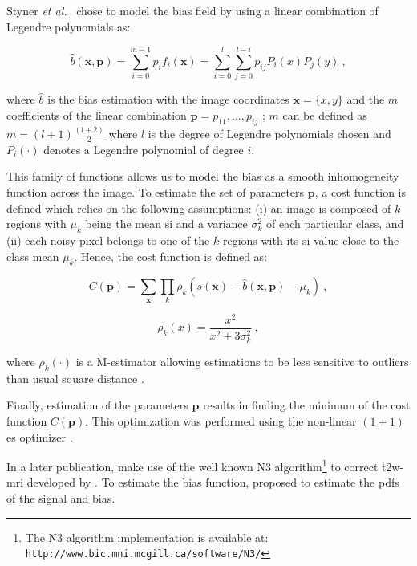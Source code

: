 \begin{enumerate}[leftmargin=*]
{\color{blue}
Styner \textit{et al.}~\cite{Styner2000} chose to model the bias field by using a linear combination of Legendre polynomials as:

\begin{equation}
	\hat{b}(\mathbf{x},\mathbf{p}) = \sum_{i=0}^{m-1} p_i f_i(\mathbf{x}) =  \sum_{i=0}^{l} \sum_{j=0}^{l-i} p_{ij} P_i(x) P_j(y) \ ,
	\label{eq:biascorr}
\end{equation}

\noindent where $\hat{b}$ is the bias estimation with the image coordinates $\mathbf{x} = \{x,y\}$ and the $m$ coefficients of the linear combination $\mathbf{p} = {p_{11},\dotsc,p_{ij}}$ ; $m$ can be defined as $m=(l+1)\frac{(l+2)}{2}$ where $l$ is the degree of Legendre polynomials chosen and $P_i(\cdot)$ denotes a Legendre polynomial of degree $i$.

This family of functions allows us to model the bias as a smooth inhomogeneity function across the image.
To estimate the set of parameters $\mathbf{p}$, a cost function is defined which relies on the following assumptions: (i) an image is composed of $k$ regions with $\mu_k$ being the mean \ac{si} and a variance $\sigma^{2}_{k}$ of each particular class, and (ii) each noisy pixel belongs to one of the $k$ regions with its \ac{si} value close to the class mean $\mu_k$.
Hence, the cost function is defined as:

\begin{equation}
	C(\mathbf{p}) = \sum_{\mathbf{x}} \prod_{k} \rho_k(s(\mathbf{x}) - \hat{b}(\mathbf{x},\mathbf{p}) - \mu_k) \ ,
	\label{eq:costbias}
\end{equation}

\begin{equation}
	\rho_k(x) = \frac{x^2}{x^2 + 3 \sigma_k^2} \ ,
	\label{eq:mestbias}
\end{equation}

\noindent where $\rho_k(\cdot)$ is a M-estimator allowing estimations to be less sensitive to outliers than usual square distance \cite{Li1996}.

Finally, estimation of the parameters $\mathbf{p}$ results in finding the minimum of the cost function $C(\mathbf{p})$.
This optimization was performed using the non-linear $(1+1)$ \ac{es} optimizer \cite{Styner1997}.

In a later publication, \cite{Viswanath2012} make use of the well known N3 algorithm\footnote{The N3 algorithm implementation is available at: \texttt{http://www.bic.mni.mcgill.ca/\allowbreak software/N3/}} to correct \ac{t2w}-\ac{mri} developed by \cite{Sled1998}.
To estimate the bias function, \cite{Sled1998} proposed to estimate the \acp{pdf} of the signal and bias.

}
\end{enumerate}
